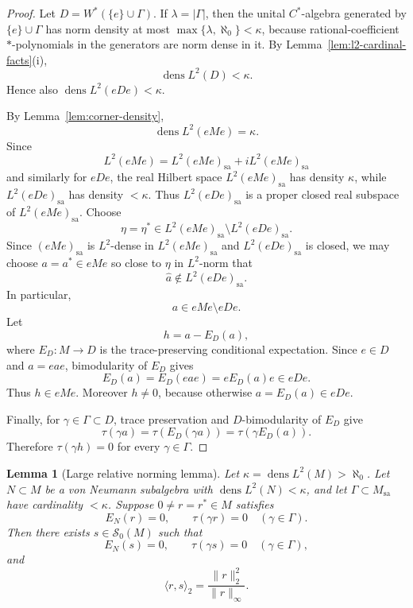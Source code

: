 \documentclass[11pt,letterpaper,reqno]{amsart}
\newtheorem{lem}[thm]{Lemma}
\theoremstyle{definition}
\numberwithin{equation}{section}
\newcommand{\sa}{\mathrm{sa}}
\DeclareMathOperator{\dens}{dens}
\begin{document}
\begin{proof}
Let $D=W^*(\{e\}\cup\Gamma)$.  If $\lambda=|\Gamma|$, then the unital
$C^*$-algebra generated by $\{e\}\cup\Gamma$ has norm density at most
$\max\{\lambda,\aleph_0\}<\kappa$, because rational-coefficient
$*$-polynomials in the generators are norm dense in it.  By
Lemma~\ref{lem:l2-cardinal-facts}(i),
\[
   \dens L^2(D)<\kappa.
\]
Hence also $\dens L^2(eDe)<\kappa$.

By Lemma~\ref{lem:corner-density},
\[
   \dens L^2(eMe)=\kappa.
\]
Since
\[
   L^2(eMe)=L^2(eMe)_{\sa}+iL^2(eMe)_{\sa}
\]
and similarly for \(eDe\), the real Hilbert space
\(L^2(eMe)_{\sa}\) has density \(\kappa\), while
\(L^2(eDe)_{\sa}\) has density \(<\kappa\).  Thus
\(L^2(eDe)_{\sa}\) is a proper closed real subspace of
\(L^2(eMe)_{\sa}\). Choose
\[
   \eta=\eta^*\in L^2(eMe)_{\sa}\setminus L^2(eDe)_{\sa}.
\]
Since $(eMe)_{\sa}$ is $L^2$-dense in $L^2(eMe)_{\sa}$ and
$L^2(eDe)_{\sa}$ is closed, we may choose
\(a=a^*\in eMe\) so close to \(\eta\) in \(L^2\)-norm that
\[
   \widehat a\notin L^2(eDe)_{\sa}.
\]
In particular,
\[
   a\in eMe\setminus eDe .
\]
Let
\[
   h=a-E_D(a),
\]
where $E_D:M\to D$ is the trace-preserving conditional expectation. Since $e\in D$ and $a=eae$, bimodularity of $E_D$ gives
\[
   E_D(a)=E_D(eae)=eE_D(a)e\in eDe.
\]
Thus $h\in eMe$.  Moreover $h\neq0$, because otherwise $a=E_D(a)\in eDe$.

Finally, for $\gamma\in\Gamma\subset D$, trace preservation and
$D$-bimodularity of $E_D$ give
\[
   \tau(\gamma a)
   =\tau(E_D(\gamma a))
   =\tau(\gamma E_D(a)).
\]
Therefore $\tau(\gamma h)=0$ for every $\gamma\in\Gamma$.
\end{proof}

\begin{lem}[Large relative norming lemma]\label{lem:large-relative-norming}
Let $\kappa=\dens L^2(M)>\aleph_0$.  Let $N\subset M$ be a von Neumann subalgebra with $\dens L^2(N)<\kappa$, and let $\Gamma\subset M_{\sa}$ have cardinality $<\kappa$.  Suppose $0\neq r=r^*\in M$ satisfies
\[
   E_N(r)=0,
   \qquad
   \tau(\gamma r)=0\quad(\gamma\in\Gamma).
\]
Then there exists $s\in\mathcal S_0(M)$ such that
\[
   E_N(s)=0,
   \qquad
   \tau(\gamma s)=0\quad(\gamma\in\Gamma),
\]
and
\[
   \langle r,s\rangle_2=\frac{\|r\|_2^2}{\|r\|_\infty}.
\]
\end{lem}
\end{document}
